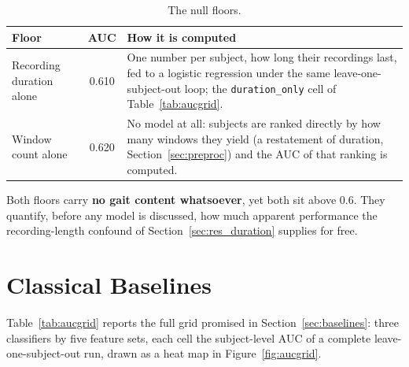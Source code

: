 \begin{table}[htbp]
  \centering
  \caption[The null floors]{The null floors.}
  \label{tab:floors}
  \small
  \begin{tabular}{@{}lcp{8.2cm}@{}}
    \toprule
    Floor & AUC & How it is computed \\
    \midrule
    Recording duration alone & 0.610 &
      One number per subject, how long their recordings last, fed to a
      logistic regression under the same leave-one-subject-out loop; the
      \texttt{duration\_only} cell of Table~\ref{tab:aucgrid}. \\
    Window count alone & 0.620 &
      No model at all: subjects are ranked directly by how many windows they
      yield (a restatement of duration, Section~\ref{sec:preproc}) and the
      AUC of that ranking is computed. \\
    \bottomrule
  \end{tabular}
\end{table}

Both floors carry \textbf{no gait content whatsoever}, yet both sit above
0.6. They quantify, before any model is discussed, how much apparent
performance the recording-length confound of Section~\ref{sec:res_duration} supplies for free.

\section{Classical Baselines}
\label{sec:res-baselines}

Table~\ref{tab:aucgrid} reports the full grid promised in
Section~\ref{sec:baselines}: three classifiers by five feature sets, each
cell the subject-level AUC of a complete leave-one-subject-out run, drawn as
a heat map in Figure~\ref{fig:aucgrid}.

